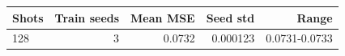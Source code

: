 \begin{tabular}{lrrrr}
\toprule
Shots & Train seeds & Mean MSE & Seed std & Range \\
\midrule
128 & 3 & 0.0732 & 0.000123 & 0.0731-0.0733 \\
\bottomrule
\end{tabular}

